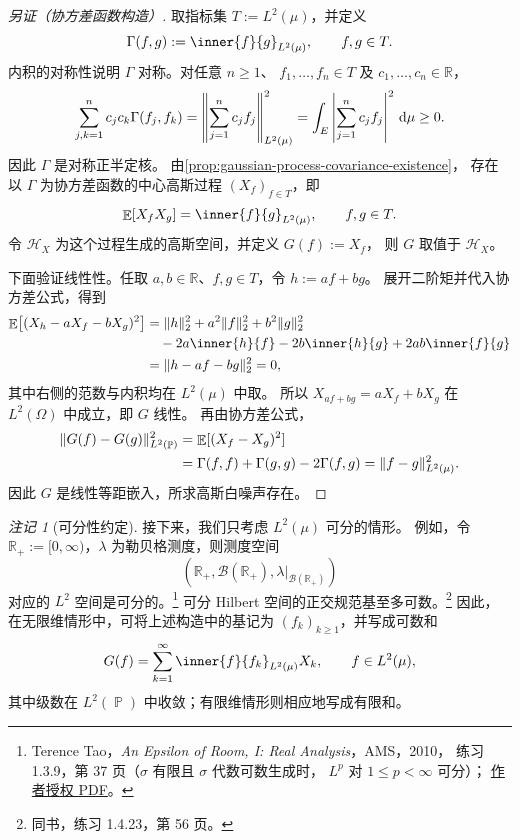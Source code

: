\documentclass[UTF8,11pt,a4paper,oneside,fontset=fandol]{ctexrep}
\numberwithin{equation}{section}
\theoremstyle{plain}
\theoremstyle{definition}
\theoremstyle{remark}
\newtheorem{remark}[theorem]{注记}
\newcommand{\R}{\mathbb{R}}
\newcommand{\B}{\mathcal{B}}
\newcommand{\Hcal}{\mathcal{H}}
\DeclareMathOperator{\Prob}{\mathbb{P}}
\DeclareMathOperator{\E}{\mathbb{E}}
\newcommand{\dd}{\mathop{}\!\mathrm{d}}
\DeclarePairedDelimiter{\norm}{\lVert}{\rVert}
\begin{document}
\begin{proof}[另证（协方差函数构造）]
取指标集 $T:=L^2(\mu)$，并定义
\[
  \Gamma(f,g):=\inner{f}{g}_{L^2(\mu)},\qquad f,g\in T.
\]
内积的对称性说明 $\Gamma$ 对称。对任意 $n\ge1$、
$f_1,\ldots,f_n\in T$ 及 $c_1,\ldots,c_n\in\R$，
\[
  \sum_{j,k=1}^{n}c_jc_k\Gamma(f_j,f_k)
  =\norm*{\sum_{j=1}^{n}c_jf_j}_{L^2(\mu)}^2
  =\int_E\left|\sum_{j=1}^{n}c_jf_j\right|^2\,\dd\mu\ge0.
\]
因此 $\Gamma$ 是对称正半定核。
由\cref{prop:gaussian-process-covariance-existence}，
存在以 $\Gamma$ 为协方差函数的中心高斯过程 $(X_f)_{f\in T}$，即
\[
  \E[X_fX_g]=\inner{f}{g}_{L^2(\mu)},\qquad f,g\in T.
\]
令 $\Hcal_X$ 为这个过程生成的高斯空间，并定义 $G(f):=X_f$，
则 $G$ 取值于 $\Hcal_X$。

下面验证线性性。任取 $a,b\in\R$、$f,g\in T$，令 $h:=af+bg$。
展开二阶矩并代入协方差公式，得到
\begin{align*}
  \E\bigl[(X_h-aX_f-bX_g)^2\bigr]
  &=\norm{h}_2^2+a^2\norm{f}_2^2+b^2\norm{g}_2^2\\
  &\quad-2a\inner{h}{f}-2b\inner{h}{g}+2ab\inner{f}{g}\\
  &=\norm{h-af-bg}_2^2=0,
\end{align*}
其中右侧的范数与内积均在 $L^2(\mu)$ 中取。
所以 $X_{af+bg}=aX_f+bX_g$ 在 $L^2(\Omega)$ 中成立，即 $G$ 线性。
再由协方差公式，
\begin{align*}
  \norm{G(f)-G(g)}_{L^2(\Prob)}^2
  &=\E[(X_f-X_g)^2]\\
  &=\Gamma(f,f)+\Gamma(g,g)-2\Gamma(f,g)
   =\norm{f-g}_{L^2(\mu)}^2.
\end{align*}
因此 $G$ 是线性等距嵌入，所求高斯白噪声存在。
\end{proof}

\begin{remark}[可分性约定]
\label{rem:white-noise-separable-convention}
接下来，我们只考虑 $L^2(\mu)$ 可分的情形。
例如，令 $\R_+:=[0,\infty)$，$\lambda$ 为勒贝格测度，则测度空间
\[
  \left(\R_+,\B(\R_+),\lambda\big|_{\B(\R_+)}\right)
\]
对应的 $L^2$ 空间是可分的。\footnote{%
Terence Tao，\emph{An Epsilon of Room, I: Real Analysis}，AMS，2010，
练习 1.3.9，第 37 页（$\sigma$ 有限且 $\sigma$ 代数可数生成时，
$L^p$ 对 $1\le p<\infty$ 可分）；
\href{https://terrytao.wordpress.com/wp-content/uploads/2012/12/gsm-117-tao3-epsilon1.pdf}{作者授权 PDF}。}
可分 Hilbert 空间的正交规范基至多可数。\footnote{%
同书，练习 1.4.23，第 56 页。}
因此，在无限维情形中，可将上述构造中的基记为 $(f_k)_{k\ge1}$，并写成可数和
\[
  G(f)=\sum_{k=1}^{\infty}\inner{f}{f_k}_{L^2(\mu)}X_k,
  \qquad f\in L^2(\mu),
\]
其中级数在 $L^2(\Prob)$ 中收敛；有限维情形则相应地写成有限和。
\end{remark}
\end{document}
